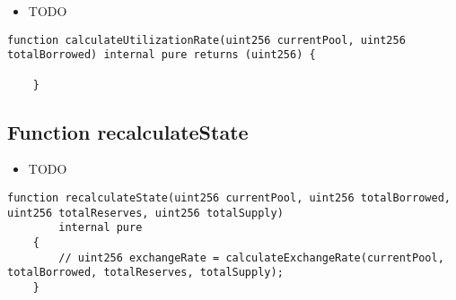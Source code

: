\noindent\begin{itemize}
\item TODO
\end{itemize}

\begin{lstlisting}[firstnumber=4]
    function calculateUtilizationRate(uint256 currentPool, uint256 totalBorrowed) internal pure returns (uint256) {

    }
\end{lstlisting}

\subsection{Function recalculateState}

\noindent\begin{itemize}
\item TODO
\end{itemize}

\begin{lstlisting}[firstnumber=20]
    function recalculateState(uint256 currentPool, uint256 totalBorrowed, uint256 totalReserves, uint256 totalSupply)
        internal pure 
    {
        // uint256 exchangeRate = calculateExchangeRate(currentPool, totalBorrowed, totalReserves, totalSupply);
    }
\end{lstlisting}
